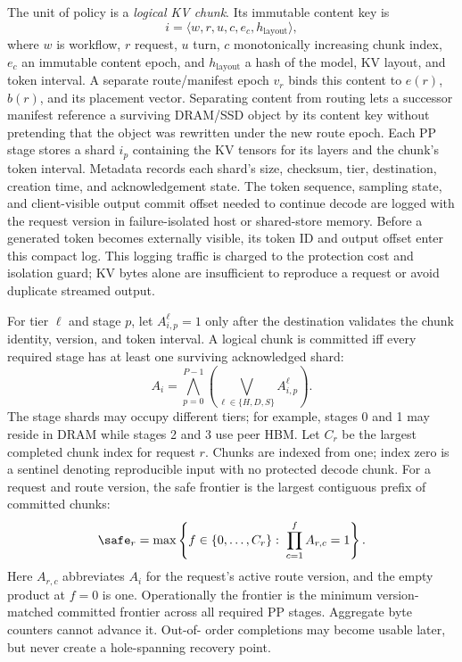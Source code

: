 The unit of policy is a \emph{logical KV chunk}.  Its immutable content key is
\begin{equation}
  i=\langle w,r,u,c,e_c,h_{\mathrm{layout}}\rangle,
  \label{eq:chunk-id}
\end{equation}
where $w$ is workflow, $r$ request, $u$ turn, $c$ monotonically increasing
chunk index, $e_c$ an immutable content epoch, and $h_{\mathrm{layout}}$ a hash
of the model, KV layout, and token interval.  A separate route/manifest epoch
$v_r$ binds this content to $e(r)$, $b(r)$, and its placement vector.  Separating
content from routing lets a successor manifest reference a surviving DRAM/SSD
object by its content key without pretending that the object was rewritten
under the new route epoch.
Each PP stage stores a shard $i_p$ containing the KV tensors for its layers and
the chunk's token interval.  Metadata records each shard's size, checksum,
tier, destination, creation time, and acknowledgement state.  The token
sequence, sampling state, and client-visible output commit offset needed to
continue decode are logged with the request version in failure-isolated host or
shared-store memory.  Before a generated token becomes externally visible, its
token ID and output offset enter this compact log.  This logging traffic is
charged to the protection cost and isolation guard; KV bytes alone are
insufficient to reproduce a request or avoid duplicate streamed output.

For tier $\ell$ and stage $p$, let $A_{i,p}^{\ell}=1$ only after the
destination validates the chunk identity, version, and token interval.  A
logical chunk is committed iff every required stage has at least one surviving
acknowledged shard:
\begin{equation}
  A_i=\bigwedge_{p=0}^{P-1}
      \left(\bigvee_{\ell\in\{H,D,S\}} A_{i,p}^{\ell}\right).
  \label{eq:all-stage-ack}
\end{equation}
The stage shards may occupy different tiers; for example, stages 0 and 1 may
reside in DRAM while stages 2 and 3 use peer HBM.  Let $C_r$ be the largest
completed chunk index for request $r$.  Chunks are indexed from one; index zero
is a sentinel denoting reproducible input with no protected decode chunk.  For
a request and route version, the safe frontier is the largest
contiguous prefix of committed chunks:
\begin{equation}
  \safe_r = \max\left\{f\in\{0,\ldots,C_r\}:\;
    \prod_{c=1}^{f} A_{r,c}=1\right\}.
  \label{eq:safe-frontier}
\end{equation}
Here $A_{r,c}$ abbreviates $A_i$ for the request's active route version, and
the empty product at $f=0$ is one.
Operationally the frontier is the minimum version-matched committed frontier across
all required PP stages.  Aggregate byte counters cannot advance it.  Out-of-
order completions may become usable later, but never create a hole-spanning
recovery point.

